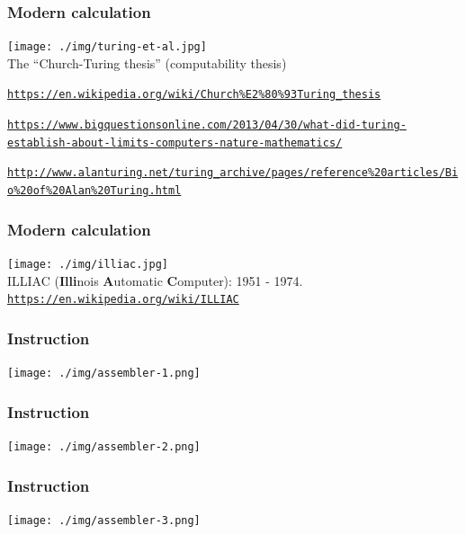 \documentclass[11pt]{beamer}
\begin{document}
\begin{frame}[fragile]
  \frametitle{Modern calculation}
 \centering
  \texttt{[image: ./img/turing-et-al.jpg]}\\
  The ``Church-Turing thesis'' (computability thesis)
  
   \begin{itemize} 
   	\myitem \textcolor{\CSBase}{\tiny \texttt{\url{https://en.wikipedia.org/wiki/Church\%E2\%80\%93Turing_thesis}}}
   	
   	\myitem \textcolor{\CSBase}{\tiny \texttt{\url{https://www.bigquestionsonline.com/2013/04/30/what-did-turing-establish-about-limits-computers-nature-mathematics/}}}
   
    	\myitem \textcolor{\CSBase}{\tiny \texttt{\url{http://www.alanturing.net/turing_archive/pages/reference\%20articles/Bio\%20of\%20Alan\%20Turing.html}}}
   
   \end{itemize}
\end{frame}


\begin{frame}[fragile]
	\frametitle{Modern calculation}
	
	\texttt{[image: ./img/illiac.jpg]}\\
	{\small ILLIAC ({\bf Illi}nois {\bf A}utomatic {\bf C}omputer): 1951 - 1974. }
	\textcolor{\CSBase}{\small \texttt{\url{https://en.wikipedia.org/wiki/ILLIAC}}}
\end{frame}


\begin{frame}[fragile]
  \frametitle{Instruction}

  \texttt{[image: ./img/assembler-1.png]}
\end{frame}

\begin{frame}[fragile]
  \frametitle{Instruction}

  \texttt{[image: ./img/assembler-2.png]}
\end{frame}

\begin{frame}[fragile]
  \frametitle{Instruction}

  \texttt{[image: ./img/assembler-3.png]}
\end{frame}
\end{document}
